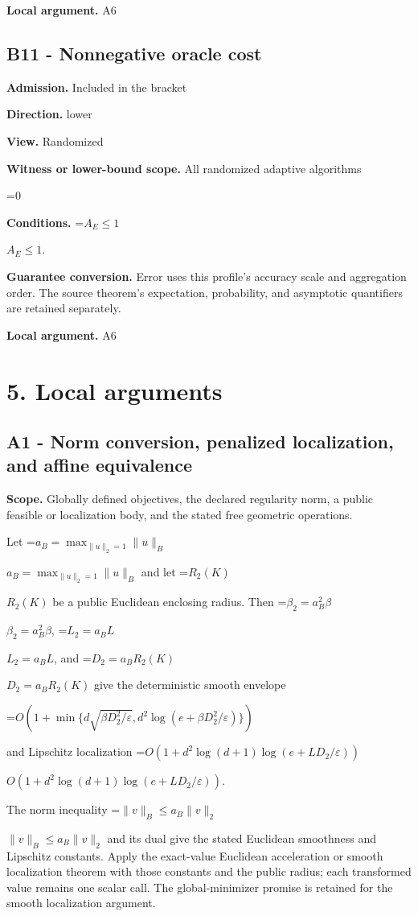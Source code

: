 \documentclass[10pt,a4paper]{article}
\newcommand{\AtlasMath}[1]{\par\begingroup\centering\setbox0=\hbox{$\displaystyle #1$}\ifdim\wd0>1.4\linewidth\typeout{ATLAS WIDE FORMULA: \the\wd0}\fi\ifdim\wd0>\linewidth\resizebox{\linewidth}{!}{\box0}\else\box0\fi\par\endgroup}
\newcommand{\AtlasInlineMath}[1]{\begingroup\setbox0=\hbox{$#1$}\ifdim\wd0>.4\linewidth\endgroup\AtlasMath{#1}\else\endgroup$#1$\fi}
\begin{document}
\textbf{Local argument.} A6

\subsection{B11 - Nonnegative oracle cost}
\textbf{Admission.} Included in the bracket

\textbf{Direction.} lower

\textbf{View.} Randomized

\textbf{Witness or lower-bound scope.} All randomized adaptive algorithms

\AtlasMath{0}
\textbf{Conditions.} \AtlasInlineMath{A_E\le1}.

\textbf{Guarantee conversion.} Error uses this profile's accuracy scale and aggregation order. The source theorem's expectation, probability, and asymptotic quantifiers are retained separately.

\textbf{Local argument.} A6

\section{5. Local arguments}
\subsection{A1 - Norm conversion, penalized localization, and affine equivalence}
\textbf{Scope.} Globally defined objectives, the declared regularity norm, a public feasible or localization body, and the stated free geometric operations.

Let \AtlasInlineMath{a_B=\max_{\|u\|_2=1}\|u\|_B} and let \AtlasInlineMath{R_2(K)} be a public Euclidean enclosing radius. Then \AtlasInlineMath{\beta_2=a_B^2\beta}, \AtlasInlineMath{L_2=a_BL}, and \AtlasInlineMath{D_2=a_BR_2(K)} give the deterministic smooth envelope

\AtlasMath{O\!\left(1+\min\{d\sqrt{\beta D_2^2/\varepsilon},d^2\log(e+\beta D_2^2/\varepsilon)\}\right)}

and Lipschitz localization \AtlasInlineMath{O(1+d^2\log(d+1)\log(e+LD_2/\varepsilon))}.

The norm inequality \AtlasInlineMath{\|v\|_B\le a_B\|v\|_2} and its dual give the stated Euclidean smoothness and Lipschitz constants. Apply the exact-value Euclidean acceleration or smooth localization theorem with those constants and the public radius; each transformed value remains one scalar call. The global-minimizer promise is retained for the smooth localization argument.
\end{document}
